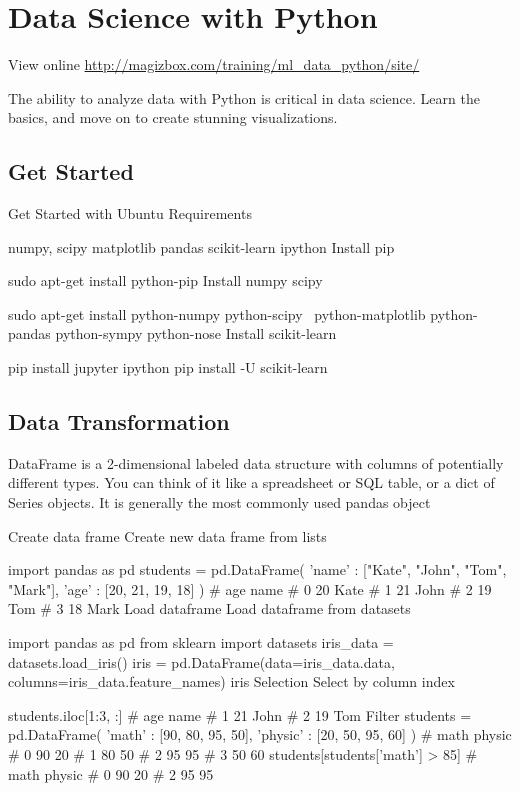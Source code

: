 \chapter{Data Science with Python}

View online \href{http://magizbox.com/training/ml_data_python/site/}{http://magizbox.com/training/ml_data_python/site/}

The ability to analyze data with Python is critical in data science. Learn the basics, and move on to create stunning visualizations.

\section{Get Started}

Get Started with Ubuntu
Requirements

numpy, scipy
matplotlib
pandas
scikit-learn
ipython
Install pip

sudo apt-get install python-pip
Install numpy scipy

sudo apt-get install python-numpy python-scipy \
    python-matplotlib python-pandas python-sympy python-nose
Install scikit-learn

pip install jupyter ipython pip install -U scikit-learn

\section{Data Transformation}

DataFrame is a 2-dimensional labeled data structure with columns of potentially different types. You can think of it like a spreadsheet or SQL table, or a dict of Series objects. It is generally the most commonly used pandas object

Create data frame
Create new data frame from lists

import pandas as pd
students = pd.DataFrame({
  'name' : ["Kate", "John", "Tom", "Mark"],
  'age' : [20, 21, 19, 18]
})
#       age  name
#    0   20  Kate
#    1   21  John
#    2   19   Tom
#    3   18  Mark
Load dataframe
Load dataframe from datasets

import pandas as pd
from sklearn import datasets
iris_data = datasets.load_iris()
iris = pd.DataFrame(data=iris_data.data,
                    columns=iris_data.feature_names)
iris
Selection
Select by column index

students.iloc[1:3, :]
#       age  name
#    1   21  John
#    2   19   Tom
Filter
students = pd.DataFrame({
  'math' : [90, 80, 95, 50],
  'physic' : [20, 50, 95, 60]
})
#    math  physic
# 0    90      20
# 1    80      50
# 2    95      95
# 3    50      60
students[students['math'] > 85]
#    math  physic
# 0    90      20
# 2    95      95

